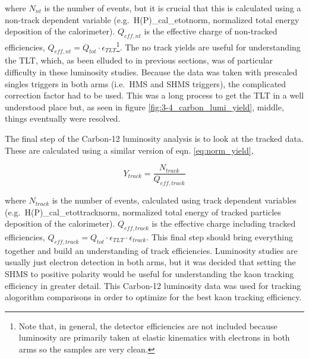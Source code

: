\documentclass[
]{report}
\begin{document}
\noindent where \(N_{nt}\) is the number of events, but it is crucial
that this is calculated using a non-track dependent variable
(e.g.~H(P)\_cal\_etotnorm, normalized total energy deposition of the
calorimeter). \(Q_{eff,nt}\) is the effective charge of non-tracked
efficiencies,
\(Q_{eff,nt}=Q_{tot}\cdot\epsilon_{TLT}\)\footnote{Note that, in general, the detector efficiencies are not included because luminosity are primarily taken at elastic kinematics with electrons in both arms so the samples are very clean.}.
The no track yields are useful for understanding the TLT, which, as been
elluded to in previous sections, was of particular difficulty in these
luminosity studies. Because the data was taken with prescaled singles
triggers in both arms (i.e.~HMS and SHMS triggers), the complicated
correction factor had to be used. This was a long process to get the TLT
in a well understood place but, as seen in figure
\ref{fig:3-4_carbon_lumi_yield}, middle, things eventually were
resolved.

The final step of the Carbon-12 luminosity analysis is to look at the
tracked data. These are calculated using a similar version of eqn.
\ref{eq:norm_yield},

\begin{equation} 
  Y_{track}=\frac{N_{track}}{Q_{eff,track}}
  \label{eq:track_yield} 
\end{equation}

\noindent where \(N_{track}\) is the number of events, calculated using
track dependent variables (e.g.~H(P)\_cal\_etottracknorm, normalized
total energy of tracked particles deposition of the calorimeter).
\(Q_{eff,track}\) is the effective charge including tracked
efficiencies,
\(Q_{eff,track}=Q_{tot}\cdot\epsilon_{TLT}\cdot\epsilon_{track}\). This
final step should bring everything together and build an understanding
of track efficiencies. Luminosity studies are usually just electron
detection in both arms, but it was decided that setting the SHMS to
positive polarity would be useful for understanding the kaon tracking
efficiency in greater detail. This Carbon-12 luminosity data was used
for tracking alogorithm comparisons in order to optimize for the best
kaon tracking efficiency.
\end{document}
